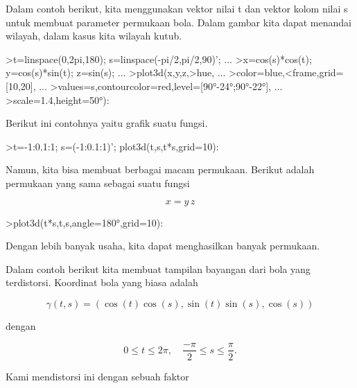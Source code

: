 \documentclass{article}
\begin{document}
\begin{eulernotebook}
\begin{eulercomment}
\begin{eulercomment}
\begin{eulercomment}
\begin{eulercomment}
\begin{eulercomment}
\begin{eulercomment}
\begin{eulercomment}
Dalam contoh berikut, kita menggunakan vektor nilai t dan vektor kolom
nilai s untuk membuat parameter permukaan bola. Dalam gambar kita
dapat menandai wilayah, dalam kasus kita wilayah kutub.
\end{eulercomment}
\begin{eulerprompt}
>t=linspace(0,2pi,180); s=linspace(-pi/2,pi/2,90)'; ...
>x=cos(s)*cos(t); y=cos(s)*sin(t); z=sin(s); ...
>plot3d(x,y,z,>hue, ...
>color=blue,<frame,grid=[10,20], ...
>values=s,contourcolor=red,level=[90°-24°;90°-22°], ...
>scale=1.4,height=50°):
\end{eulerprompt}
\begin{eulercomment}
Berikut ini contohnya yaitu grafik suatu fungsi.
\end{eulercomment}
\begin{eulerprompt}
>t=-1:0.1:1; s=(-1:0.1:1)'; plot3d(t,s,t*s,grid=10):
\end{eulerprompt}
\begin{eulercomment}
Namun, kita bisa membuat berbagai macam permukaan. Berikut adalah
permukaan yang sama sebagai suatu fungsi

\end{eulercomment}
\begin{eulerformula}
\[
x = y \, z
\]
\end{eulerformula}
\begin{eulerprompt}
>plot3d(t*s,t,s,angle=180°,grid=10):
\end{eulerprompt}
\begin{eulercomment}
Dengan lebih banyak usaha, kita dapat menghasilkan banyak permukaan.

Dalam contoh berikut kita membuat tampilan bayangan dari bola yang
terdistorsi. Koordinat bola yang biasa adalah

\end{eulercomment}
\begin{eulerformula}
\[
\gamma(t,s) = (\cos(t)\cos(s),\sin(t)\sin(s),\cos(s))
\]
\end{eulerformula}
\begin{eulercomment}
dengan

\end{eulercomment}
\begin{eulerformula}
\[
0 \le t \le 2\pi, \quad \frac{-\pi}{2} \le s \le \frac{\pi}{2}.
\]
\end{eulerformula}
\begin{eulercomment}
Kami mendistorsi ini dengan sebuah faktor


\end{eulercomment}
\end{eulercomment}
\end{eulercomment}
\end{eulercomment}
\end{eulercomment}
\end{eulercomment}
\end{eulercomment}
\end{eulernotebook}
\end{document}
